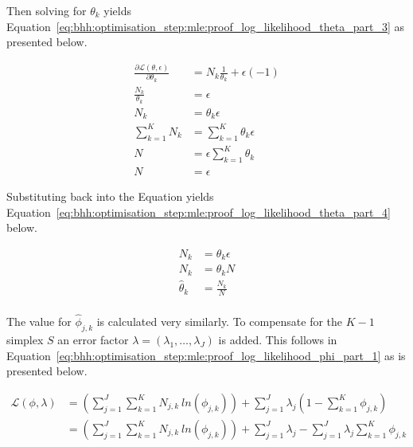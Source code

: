 Then solving for $\theta_{k}$ yields Equation~\eqref{eq:bhh:optimisation_step:mle:proof_log_likelihood_theta_part_3} as presented below.

\begin{equation}
      \label{eq:bhh:optimisation_step:mle:proof_log_likelihood_theta_part_3}
      \begin{split}
            \frac{\partial \mathcal{L}(\theta, \epsilon)}{\partial \theta_{k}} &=  N_{k} \frac{1}{\theta_{k}}  + \epsilon(-1) \\
            \frac{N_{k}}{\theta_{k}} &= \epsilon \\
            N_{k} &= \theta_{k} \epsilon \\
            \sum_{k=1}^{K} N_{k} &= \sum_{k=1}^{K} \theta_{k} \epsilon \\
            N &= \epsilon \sum_{k=1}^{K} \theta_{k} \\
            N &= \epsilon
      \end{split}
\end{equation}

Substituting back into the Equation yields Equation~\eqref{eq:bhh:optimisation_step:mle:proof_log_likelihood_theta_part_4} below.

\begin{equation}
      \label{eq:bhh:optimisation_step:mle:proof_log_likelihood_theta_part_4}
      \begin{split}
            N_{k} &= \theta_{k} \epsilon \\
            N_{k} &= \theta_{k} N \\
            \hat{\theta}_{k} &= \frac{N_{k}}{N}\\
      \end{split}
\end{equation}

The value for $\hat{\phi}_{j, k} $ is calculated very similarly. To compensate for the $K-1$ simplex $S$ an error factor $\lambda = (\lambda_{1}, \dots, \lambda_{J})$ is added. This follows in Equation~\eqref{eq:bhh:optimisation_step:mle:proof_log_likelihood_phi_part_1} as is presented below.

\begin{equation}
      \label{eq:bhh:optimisation_step:mle:proof_log_likelihood_phi_part_1}
      \begin{split}
            \mathcal{L}(\phi, \lambda)
            &=  \left( \sum_{j=1}^{J} \sum_{k=1}^{K} N_{j,k} \ ln \left( \phi_{j,k} \right) \right) + \sum_{j=1}^{J} \lambda_{j} \left( 1 - \sum_{k=1}^{K} \phi_{j,k} \right) \\
            &=  \left( \sum_{j=1}^{J} \sum_{k=1}^{K} N_{j,k} \ ln \left( \phi_{j,k} \right) \right) + \sum_{j=1}^{J} \lambda_{j} - \sum_{j=1}^{J} \lambda_{j} \sum_{k=1}^{K} \phi_{j,k} \\
      \end{split}
\end{equation}

